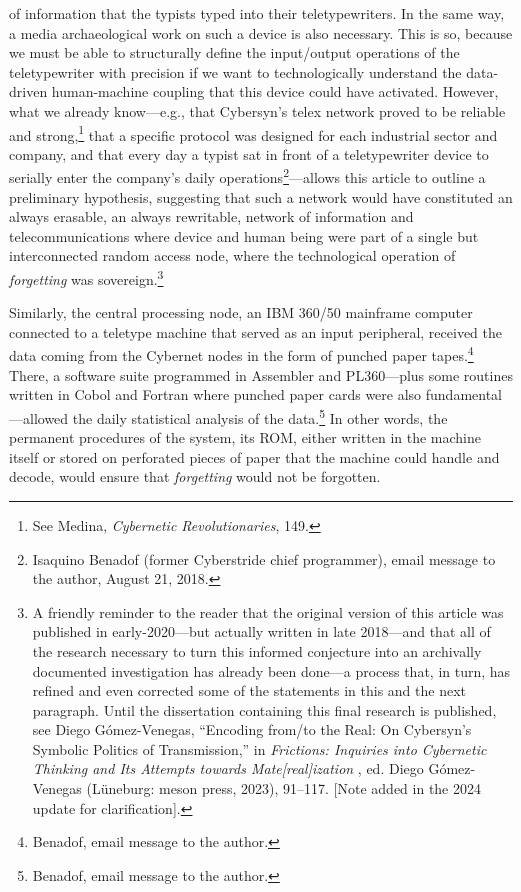 \documentclass{tufte-handout}
\begin{document}
of information that the typists typed into their teletypewriters. In the
same way, a media archaeological work on such a device is also
necessary. This is so, because we must be able to structurally define
the input/output operations of the teletypewriter with precision if we
want to technologically understand the data-driven human-machine
coupling that this device could have activated. However, what we already
know---e.g., that Cybersyn's telex network proved to be reliable and
strong,\footnote{See Medina, \emph{Cybernetic Revolutionaries}, 149.}
that a specific protocol was designed for each industrial sector and
company, and that every day a typist sat in front of a teletypewriter
device to serially enter the company's daily
operations\footnote{Isaquino Benadof (former Cyberstride chief
  programmer), email message to the author, August 21, 2018.}---allows
this article to outline a preliminary hypothesis, suggesting that such a
network would have constituted an always erasable, an always rewritable,
network of information and telecommunications where device and human
being were part of a single but interconnected random access node, where
the technological operation of \emph{forgetting} was
sovereign.\footnote{A friendly reminder to the reader that the original
  version of this article was published in early-2020---but actually
  written in late 2018---and that all of the research necessary to turn
  this informed conjecture into an archivally documented investigation
  has already been done---a process that, in turn, has refined and even
  corrected some of the statements in this and the next paragraph. Until
  the dissertation containing this final research is published, see
  Diego Gómez-Venegas, ``Encoding from/to the Real: On Cybersyn's
  Symbolic Politics of Transmission,'' in \emph{Frictions: Inquiries
  into Cybernetic Thinking and Its Attempts towards
  Mate{[}real{]}ization} , ed. Diego Gómez-Venegas (Lüneburg: meson
  press, 2023), 91--117. {[}Note added in the 2024 update for
  clarification{]}.}

Similarly, the central processing node, an IBM 360/50 mainframe computer
connected to a teletype machine that served as an input peripheral,
received the data coming from the Cybernet nodes in the form of punched
paper tapes.\footnote{Benadof, email message to the author.} There, a
software suite programmed in Assembler and PL360---plus some routines
written in Cobol and Fortran where punched paper cards were also
fundamental---allowed the daily statistical analysis of the
data.\footnote{Benadof, email message to the author.} In other words,
the permanent procedures of the system, its ROM, either written in the
machine itself or stored on perforated pieces of paper that the machine
could handle and decode, would ensure that \emph{forgetting} would not
be forgotten.
\end{document}
